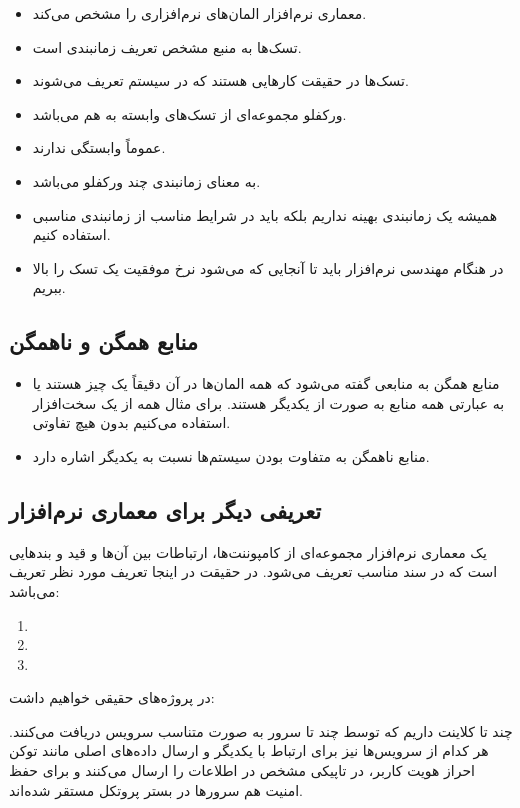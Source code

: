 \documentclass[a4paper]{article}
\begin{document}
\begin{itemize}
    \item معماری نرم‌افزار المان‌های نرم‌افزاری را مشخص می‌کند.
    \item {} تسک‌ها به منبع مشخص تعریف زمانبندی است.
    \item تسک‌ها در حقیقت کار‌هایی هستند که در سیستم تعریف می‌شوند.
    \item ورکفلو مجموعه‌ای از تسک‌های وابسته به هم می‌باشد.
    \item {} عموماً وابستگی ندارند.
    \item {} به معنای زمانبندی چند ورکفلو
    می‌باشد.
    \item همیشه یک زمانبندی بهینه نداریم بلکه باید در شرایط مناسب از زمانبندی
    مناسبی استفاده کنیم.
    \item در هنگام مهندسی نرم‌افزار باید تا آنجایی که می‌شود نرخ موفقیت یک تسک
    را بالا ببریم.
\end{itemize}

\subsection{منابع همگن و ناهمگن}

\begin{itemize}
    \item منابع همگن به منابعی گفته می‌شود که همه المان‌ها در آن دقیقاً یک چیز
    هستند یا به عبارتی همه منابع به صورت  از یکدیگر هستند. برای مثال
    همه از یک سخت‌افزار استفاده می‌کنیم بدون هیچ تفاوتی.
    \item منابع ناهمگن به متفاوت بودن سیستم‌ها نسبت به یکدیگر اشاره دارد.
\end{itemize}

\subsection{تعریفی دیگر برای معماری نرم‌افزار}

یک معماری نرم‌افزار مجموعه‌ای از کامپوننت‌ها، ارتباطات بین آن‌ها و قید و
بند‌هایی است که در سند مناسب تعریف می‌شود. در حقیقت در اینجا تعریف مورد نظر
تعریف  می‌باشد:

\begin{enumerate}
    \item {}
    \item {}
    \item {}
\end{enumerate}

در پروژه‌های حقیقی خواهیم داشت:

چند تا کلاینت داریم که توسط چند تا سرور به صورت متناسب سرویس دریافت می‌کنند. هر
کدام از سرویس‌ها نیز برای ارتباط با یکدیگر و ارسال داده‌های اصلی مانند توکن
احراز هویت کاربر، در تاپیکی مشخص در  اطلاعات را ارسال می‌کنند و برای
حفظ امنیت هم سرور‌ها در بستر پروتکل  مستقر شده‌اند.

\newpage


\end{document}
